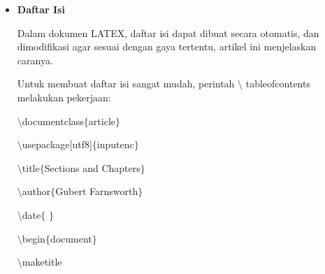 \begin{itemize}
anyvt\hspace*{0.5in}\hspace*{0.5in}\hspace*{0.5in}sort by alphabetic label, name, year, volume, title\par

ydtn\hspace*{0.5in}\hspace*{0.5in}\hspace*{0.5in}sort by year (descending), name, title\par

none\hspace*{0.5in}\hspace*{0.5in}\hspace*{0.5in}entries are processed in citation order\par

\vspace{\baselineskip}
\vspace{12pt}
\vspace{12pt}
\vspace{12pt}
	\item {\fontsize{14pt}{14pt}\selectfont \textbf{Daftar Isi}}\par
\vspace{\baselineskip}
Dalam dokumen LATEX, daftar isi dapat dibuat secara otomatis, dan dimodifikasi agar sesuai dengan gaya tertentu, artikel ini menjelaskan caranya.\par

Untuk membuat daftar isi sangat mudah, perintah $\setminus$ tableofcontents melakukan pekerjaan:\par

\hspace*{0.5in}$\setminus$documentclass$ \{ $article$ \} $\par

$\setminus$usepackage[utf8]$ \{ $inputenc$ \} $\par

$\setminus$title$ \{ $Sections and Chapters$ \} $\par

$\setminus$author$ \{ $Gubert Farnsworth$ \} $\par

$\setminus$date$ \{ $ $ \} $\par

$\setminus$begin$ \{ $document$ \} $\par

$\setminus$maketitle\par


\end{itemize}
